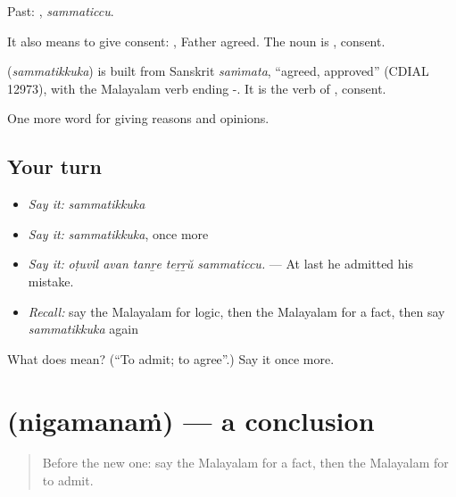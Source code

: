 Past: , \emph{sammaticcu}.

It also means to give consent:  , Father agreed. The noun is , consent.

\begin{cousinweb}
\textbf{} (\emph{sammatikkuka}) is built from Sanskrit \emph{saṁmata}, \textquotedblleft{}agreed, approved\textquotedblright{} (CDIAL 12973), with the Malayalam verb ending -. It is the verb of , consent.
\end{cousinweb}

\begin{grammarlens}[title={What you've built}]
One more word for giving reasons and opinions.
\end{grammarlens}

\subsection*{Your turn}
\begin{itemize}
\raggedright
  \item \emph{Say it:} \emph{sammatikkuka}
  \item \emph{Say it:} \emph{sammatikkuka}, once more
  \item \emph{Say it:} \emph{oṭuvil avan tanṟe teṟṟŭ sammaticcu.} — At last he admitted his mistake.
  \item \emph{Recall:} say the Malayalam for logic, then the Malayalam for a fact, then say \emph{sammatikkuka} again
\end{itemize}

\begin{tcolorbox}[breakable,colback=teal!4,colframe=teal!35!black,title={Before you move on}]
What does  mean? (\textquotedblleft{}To admit; to agree\textquotedblright{}.) Say it once more.
\end{tcolorbox}
\section[\texorpdfstring{\ml{നിഗമനം} (nigamanaṁ)}{നിഗമനം (nigamanaṁ)}]{ (nigamanaṁ) — a conclusion}

\label{lesson:ML-C405-nigamanam}



\begin{quote}
Before the new one: say the Malayalam for a fact, then the Malayalam for to admit.
\end{quote}

